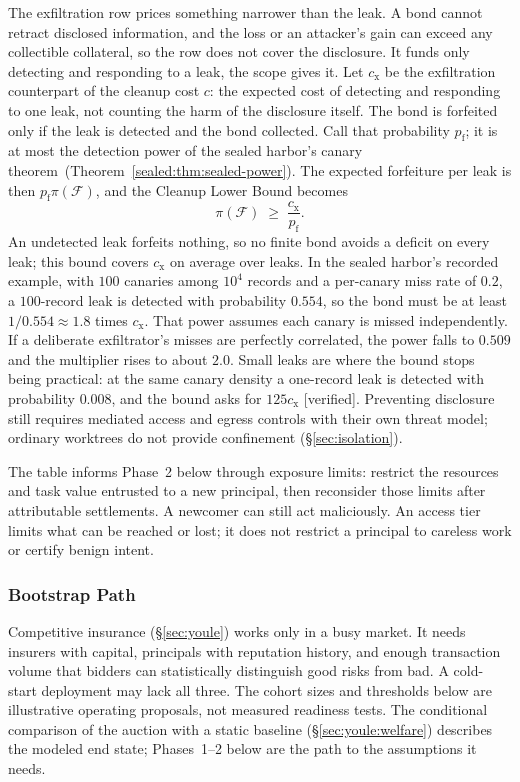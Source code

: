 \documentclass[11pt,a4paper]{article}
\theoremstyle{definition}
\theoremstyle{remark}
\begin{document}
The exfiltration row prices something narrower than the leak. A bond cannot retract disclosed information, and the loss or an attacker's gain can exceed any collectible collateral, so the row does not cover the disclosure. It funds only detecting and responding to a leak, the scope  gives it. Let $c_{\mathrm x}$ be the exfiltration counterpart of the cleanup cost $c$: the expected cost of detecting and responding to one leak, not counting the harm of the disclosure itself. The bond is forfeited only if the leak is detected and the bond collected. Call that probability $p_{\mathrm f}$; it is at most the detection power of the sealed harbor's canary theorem\ifpdbook\ (Theorem~\ref{sealed:thm:sealed-power})\fi. The expected forfeiture per leak is then $p_{\mathrm f}\pi(\mathcal F)$, and the Cleanup Lower Bound becomes
\[
\pi(\mathcal F)\;\ge\;\frac{c_{\mathrm x}}{p_{\mathrm f}}.
\]
An undetected leak forfeits nothing, so no finite bond avoids a deficit on every leak; this bound covers $c_{\mathrm x}$ on average over leaks. In the sealed harbor's recorded example, with $100$ canaries among $10^4$ records and a per-canary miss rate of $0.2$, a $100$-record leak is detected with probability $0.554$, so the bond must be at least $1/0.554\approx1.8$ times $c_{\mathrm x}$. That power assumes each canary is missed independently. If a deliberate exfiltrator's misses are perfectly correlated, the power falls to $0.509$ and the multiplier rises to about $2.0$. Small leaks are where the bound stops being practical: at the same canary density a one-record leak is detected with probability $0.008$, and the bound asks for $125c_{\mathrm x}$ [verified]. Preventing disclosure still requires mediated access and egress controls with their own threat model; ordinary worktrees do not provide confinement (\S\ref{sec:isolation}).

The table informs Phase~2 below through exposure limits: restrict the resources and task value entrusted to a new principal, then reconsider those limits after attributable settlements. A newcomer can still act maliciously. An access tier limits what can be reached or lost; it does not restrict a principal to careless work or certify benign intent.

\subsubsection{Bootstrap Path}\label{sec:pricing:bootstrap}

Competitive insurance (\S\ref{sec:youle}) works only in a busy market. It needs insurers with capital, principals with reputation history, and enough transaction volume that bidders can statistically distinguish good risks from bad. A cold-start deployment may lack all three. The cohort sizes and thresholds
below are illustrative operating proposals, not measured readiness tests. The conditional comparison of the auction with a static baseline (\S\ref{sec:youle:welfare}) describes the modeled end state; Phases~1--2 below are the path to the assumptions it needs.
\end{document}
